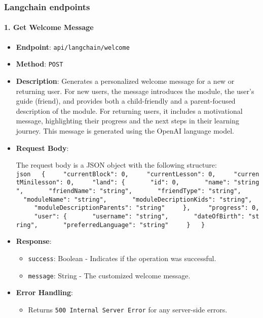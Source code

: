 \hypertarget{langchain-endpoints}{%
\subsubsection{Langchain endpoints}\label{langchain-endpoints}}

\hypertarget{get-welcome-message}{%
\paragraph{1. Get Welcome Message}\label{get-welcome-message}}

\begin{itemize}
\item
  \textbf{Endpoint}: \texttt{api/langchain/welcome}
\item
  \textbf{Method}: \texttt{POST}
\item
  \textbf{Description}: Generates a personalized welcome message for a
  new or returning user. For new users, the message introduces the
  module, the user's guide (friend), and provides both a child-friendly
  and a parent-focused description of the module. For returning users,
  it includes a motivational message, highlighting their progress and
  the next steps in their learning journey. This message is generated
  using the OpenAI language model.
\item
  \textbf{Request Body}:

  The request body is a JSON object with the following structure:
  \texttt{json\ \ \ \{\ \ \ \ \ "currentBlock":\ 0,\ \ \ \ \ "currentLesson":\ 0,\ \ \ \ \ "currentMinilesson":\ 0,\ \ \ \ \ "land":\ \{\ \ \ \ \ \ \ "id":\ 0,\ \ \ \ \ \ \ "name":\ "string",\ \ \ \ \ \ \ "friendName":\ "string",\ \ \ \ \ \ \ "friendType":\ "string",\ \ \ \ \ \ \ "moduleName":\ "string",\ \ \ \ \ \ \ "moduleDecriptionKids":\ "string",\ \ \ \ \ \ \ "moduleDescriptionParents":\ "string"\ \ \ \ \ \},\ \ \ \ \ "progress":\ 0,\ \ \ \ \ "user":\ \{\ \ \ \ \ \ \ "username":\ "string",\ \ \ \ \ \ \ "dateOfBirth":\ "string",\ \ \ \ \ \ \ "preferredLanguage":\ "string"\ \ \ \ \ \}\ \ \ \}}
\item
  \textbf{Response}:

  \begin{itemize}
  \tightlist
  \item
    \texttt{success}: Boolean - Indicates if the operation was
    successful.
  \item
    \texttt{message}: String - The customized welcome message.
  \end{itemize}
\item
  \textbf{Error Handling}:

  \begin{itemize}
  \tightlist
  \item
    Returns \texttt{500\ Internal\ Server\ Error} for any server-side
    errors.
  \end{itemize}
\end{itemize}

